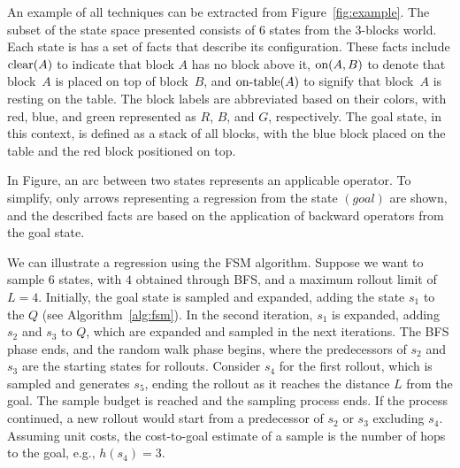 \begin{figure}[ht]
\end{figure}

An example of all techniques can be extracted from Figure~\ref{fig:example}. The subset of the state space presented consists of $6$ states from the $3$-blocks world. Each state is has a set of facts that describe its configuration. These facts include $\text{clear}(A)$ to indicate that block $A$ has no block above it, $\text{on}(A,B)$ to denote that block~$A$ is placed on top of block~$B$, and $\text{on-table}(A)$ to signify that block~$A$ is resting on the table. The block labels are abbreviated based on their colors, with red, blue, and green represented as $R$, $B$, and $G$, respectively. The goal state, in this context, is defined as a stack of all blocks, with the blue block placed on the table and the red block positioned on top.

In Figure, an arc between two states represents an applicable operator.
To simplify, only arrows representing a regression from the state $(goal)$ are shown, and the described facts are based on the application of backward operators from the goal state.

We can illustrate a regression using the FSM algorithm. Suppose we want to sample $6$ states, with $4$ obtained through BFS, and a maximum rollout limit of $L=4$. Initially, the goal state is sampled and expanded, adding the state $s_1$ to the $Q$ (see Algorithm~\ref{alg:fsm}). In the second iteration, $s_1$ is expanded, adding $s_2$ and $s_3$ to $Q$, which are expanded and sampled in the next iterations. The BFS phase ends, and the random walk phase begins, where the predecessors of $s_2$ and $s_3$ are the starting states for rollouts. Consider $s_4$ for the first rollout, which is sampled and generates $s_5$, ending the rollout as it reaches the distance $L$ from the goal. The sample budget is reached and the sampling process ends. If the process continued, a new rollout would start from a predecessor of $s_2$ or $s_3$ excluding $s_4$. Assuming unit costs, the cost-to-goal estimate of a sample is the number of hops to the goal, e.g., $h(s_4)=3$.

